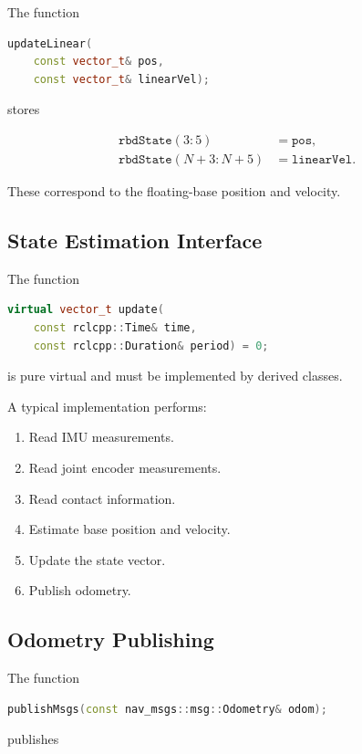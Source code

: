 The function

\begin{lstlisting}[language=C++]
updateLinear(
    const vector_t& pos,
    const vector_t& linearVel);
\end{lstlisting}

stores

\begin{align}
\texttt{rbdState}(3:5)
    &= \texttt{pos},\\
\texttt{rbdState}(N+3:N+5)
    &= \texttt{linearVel}.
\end{align}

These correspond to the floating-base position and velocity.

\subsection{State Estimation Interface}

The function

\begin{lstlisting}[language=C++]
virtual vector_t update(
    const rclcpp::Time& time,
    const rclcpp::Duration& period) = 0;
\end{lstlisting}

is pure virtual and must be implemented by derived classes.

A typical implementation performs:

\begin{enumerate}
    \item Read IMU measurements.
    \item Read joint encoder measurements.
    \item Read contact information.
    \item Estimate base position and velocity.
    \item Update the state vector.
    \item Publish odometry.
\end{enumerate}

\subsection{Odometry Publishing}

The function

\begin{lstlisting}[language=C++]
publishMsgs(const nav_msgs::msg::Odometry& odom);
\end{lstlisting}

publishes

